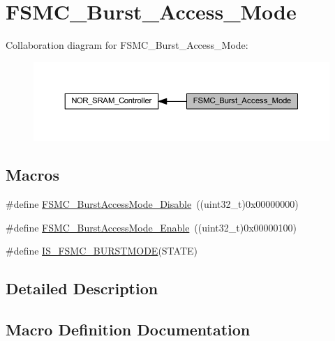 \hypertarget{group___f_s_m_c___burst___access___mode}{}\section{F\+S\+M\+C\+\_\+\+Burst\+\_\+\+Access\+\_\+\+Mode}
\label{group___f_s_m_c___burst___access___mode}
Collaboration diagram for F\+S\+M\+C\+\_\+\+Burst\+\_\+\+Access\+\_\+\+Mode\+:
\nopagebreak
\begin{figure}[H]
\begin{center}
\leavevmode
\includegraphics[width=350pt]{group___f_s_m_c___burst___access___mode}
\end{center}
\end{figure}
\subsection*{Macros}
\begin{DoxyCompactItemize}
\item 
\#define \hyperlink{group___f_s_m_c___burst___access___mode_ga26fc544945415e350563a9b00684850c}{F\+S\+M\+C\+\_\+\+Burst\+Access\+Mode\+\_\+\+Disable}~((uint32\+\_\+t)0x00000000)
\item 
\#define \hyperlink{group___f_s_m_c___burst___access___mode_ga841831dfacfdd8889dafe26cc594bf02}{F\+S\+M\+C\+\_\+\+Burst\+Access\+Mode\+\_\+\+Enable}~((uint32\+\_\+t)0x00000100)
\item 
\#define \hyperlink{group___f_s_m_c___burst___access___mode_gaf8736659c5064c3c03753d7874401e71}{I\+S\+\_\+\+F\+S\+M\+C\+\_\+\+B\+U\+R\+S\+T\+M\+O\+DE}(S\+T\+A\+TE)
\end{DoxyCompactItemize}


\subsection{Detailed Description}


\subsection{Macro Definition Documentation}
\mbox{\label{group___f_s_m_c___burst___access___mode_ga26fc544945415e350563a9b00684850c}} 
